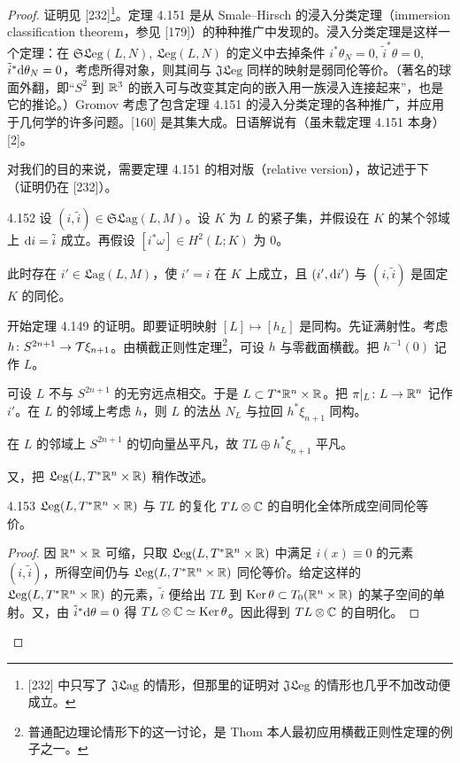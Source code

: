 \begin{proof}
  证明见 [232]\footnote{[232] 中只写了 $\mathfrak{J}\mathfrak{L}\mathrm{ag}$ 的情形，但那里的证明对 $\mathfrak{J}\mathfrak{L}\mathrm{eg}$ 的情形也几乎不加改动便成立。}。定理 4.151 是从 Smale--Hirsch 的浸入分类定理（immersion classification theorem，参见 [179]）的种种推广中发现的。浸入分类定理是这样一个定理：在 $\mathfrak{S}\mathfrak{L}\mathrm{eg}(L,N)$, $\mathfrak{L}\mathrm{eg}(L,N)$ 的定义中去掉条件 $i^*\theta_N=0$, $\tilde i^*\theta=0$, $\tilde i^*\mathrm{d}\theta_N=0$，考虑所得对象，则其间与 $\mathfrak{J}\mathfrak{L}\mathrm{eg}$ 同样的映射是弱同伦等价。（著名的球面外翻，即“$S^2$ 到 $\mathbb{R}^3$ 的嵌入可与改变其定向的嵌入用一族浸入连接起来”，也是它的推论。）Gromov 考虑了包含定理 4.151 的浸入分类定理的各种推广，并应用于几何学的许多问题。[160] 是其集大成。日语解说有（虽未载定理 4.151 本身）[2]。

  对我们的目的来说，需要定理 4.151 的相对版（relative version），故记述于下（证明仍在 [232]）。

  \begin{lemma}{4.152}
    设 $(i,\tilde i)\in\mathfrak{S}\mathfrak{L}\mathrm{ag}(L,M)$。设 $K$ 为 $L$ 的紧子集，并假设在 $K$ 的某个邻域上 $\mathrm{d} i=\tilde i$ 成立。再假设 $[i^*\omega]\in H^2(L;K)$ 为 0。

    此时存在 $i'\in\mathfrak{L}\mathrm{ag}(L,M)$，使 $i'=i$ 在 $K$ 上成立，且 $(i',\mathrm{d} i')$ 与 $(i,\tilde i)$ 是固定 $K$ 的同伦。
  \end{lemma}

  开始定理 4.149 的证明。即要证明映射 $[L]\mapsto[h_L]$ 是同构。先证满射性。考虑 $h\colon S^{2n+1}\to\mathcal{T}\xi_{n+1}$。由横截正则性定理\footnote{普通配边理论情形下的这一讨论，是 Thom 本人最初应用横截正则性定理的例子之一。}，可设 $h$ 与零截面横截。把 $h^{-1}(0)$ 记作 $L$。

  可设 $L$ 不与 $S^{2n+1}$ 的无穷远点相交。于是 $L\subset T^*\mathbb{R}^n\times\mathbb{R}$。把 $\pi|_L\colon L\to\mathbb{R}^n$ 记作 $i'$。在 $L$ 的邻域上考虑 $h$，则 $L$ 的法丛 $N_L$ 与拉回 $h^*\xi_{n+1}$ 同构。

  在 $L$ 的邻域上 $S^{2n+1}$ 的切向量丛平凡，故 $TL\oplus h^*\xi_{n+1}$ 平凡。

  又，把 $\mathfrak{L}\mathrm{eg}(L,T^*\mathbb{R}^n\times\mathbb{R})$ 稍作改述。

  \begin{lemma*}{4.153}
    $\mathfrak{L}\mathrm{eg}(L,T^*\mathbb{R}^n\times\mathbb{R})$ 与 $TL$ 的复化 $TL\otimes\mathbb{C}$ 的自明化全体所成空间同伦等价。
  \end{lemma*}

  \begin{proof}
    因 $\mathbb{R}^n\times\mathbb{R}$ 可缩，只取 $\mathfrak{L}\mathrm{eg}(L,T^*\mathbb{R}^n\times\mathbb{R})$ 中满足 $i(x)\equiv 0$ 的元素 $(i,\tilde i)$，所得空间仍与 $\mathfrak{L}\mathrm{eg}(L,T^*\mathbb{R}^n\times\mathbb{R})$ 同伦等价。给定这样的 $\mathfrak{L}\mathrm{eg}(L,T^*\mathbb{R}^n\times\mathbb{R})$ 的元素，$\tilde i$ 便给出 $TL$ 到 $\operatorname{Ker}\theta\subset T_0(\mathbb{R}^n\times\mathbb{R})$ 的某子空间的单射。又，由 $\tilde i^*\mathrm{d}\theta=0$ 得 $TL\otimes\mathbb{C}\simeq\operatorname{Ker}\theta$。因此得到 $TL\otimes\mathbb{C}$ 的自明化。


\end{proof}
\end{proof}
